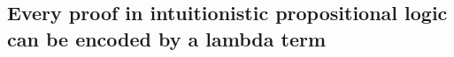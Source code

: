 \clearpage
\subsection{Every proof in intuitionistic propositional logic can be encoded by a lambda term}
\label{sec:co_p2t}